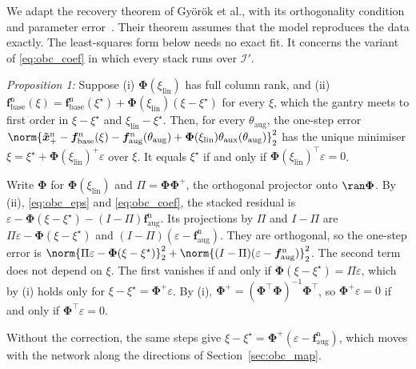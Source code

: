 We adapt the recovery theorem of Gy\"or\"ok et al., with its orthogonality
condition and parameter error~\cite[Cond.~4, Assumption~6, Thm.~7, Eq.~(21)]{gyorok2026obc}.
Their theorem assumes that the model reproduces the data exactly.
The least-squares form below needs no exact fit.
It concerns the variant of \eqref{eq:obc_coef} in which every stack runs over
$\mathcal I'$.

\textit{Proposition 1:} Suppose (i) $\boldsymbol\Phi(\xi_{\mathrm{lin}})$ has
full column rank, and (ii)
$\boldsymbol f^{\mathrm n}_{\mathrm{base}}(\xi)=\boldsymbol f^{\mathrm n}_{\mathrm{base}}(\xi^\star)+\boldsymbol\Phi(\xi_{\mathrm{lin}})(\xi-\xi^\star)$
for every $\xi$, which the gantry meets to first order in $\xi-\xi^\star$ and
$\xi_{\mathrm{lin}}-\xi^\star$.
Then, for every $\theta_{\mathrm{aug}}$, the one-step error
$\norm{\boldsymbol{\tilde x}^{\mathrm n}_{+}-\boldsymbol f^{\mathrm n}_{\mathrm{base}}(\xi)-\boldsymbol f^{\mathrm n}_{\mathrm{aug}}(\theta_{\mathrm{aug}})+\boldsymbol\Phi(\xi_{\mathrm{lin}})\theta_{\mathrm{aux}}(\theta_{\mathrm{aug}})}_2^2$
has the unique minimiser $\xi=\xi^\star+\boldsymbol\Phi(\xi_{\mathrm{lin}})^{+}\varepsilon$
over $\xi$.
It equals $\xi^\star$ if and only if
$\boldsymbol\Phi(\xi_{\mathrm{lin}})^\top\varepsilon=0$.

\begin{IEEEproof}
Write $\boldsymbol\Phi$ for $\boldsymbol\Phi(\xi_{\mathrm{lin}})$ and
$\Pi=\boldsymbol\Phi\boldsymbol\Phi^{+}$, the orthogonal projector onto
$\ran\boldsymbol\Phi$.
By (ii), \eqref{eq:obc_eps} and \eqref{eq:obc_coef}, the stacked residual is
$\varepsilon-\boldsymbol\Phi(\xi-\xi^\star)-(I-\Pi)\boldsymbol f^{\mathrm n}_{\mathrm{aug}}$.
Its projections by $\Pi$ and $I-\Pi$ are
$\Pi\varepsilon-\boldsymbol\Phi(\xi-\xi^\star)$ and
$(I-\Pi)(\varepsilon-\boldsymbol f^{\mathrm n}_{\mathrm{aug}})$.
They are orthogonal, so the one-step error is
$\norm{\Pi\varepsilon-\boldsymbol\Phi(\xi-\xi^\star)}_2^2+\norm{(I-\Pi)(\varepsilon-\boldsymbol f^{\mathrm n}_{\mathrm{aug}})}_2^2$.
The second term does not depend on $\xi$.
The first vanishes if and only if
$\boldsymbol\Phi(\xi-\xi^\star)=\Pi\varepsilon$, which by (i) holds only for
$\xi-\xi^\star=\boldsymbol\Phi^{+}\varepsilon$.
By (i), $\boldsymbol\Phi^{+}=(\boldsymbol\Phi^\top\boldsymbol\Phi)^{-1}\boldsymbol\Phi^\top$,
so $\boldsymbol\Phi^{+}\varepsilon=0$ if and only if
$\boldsymbol\Phi^\top\varepsilon=0$.
\end{IEEEproof}

Without the correction, the same steps give
$\xi-\xi^\star=\boldsymbol\Phi^{+}(\varepsilon-\boldsymbol f^{\mathrm n}_{\mathrm{aug}})$,
which moves with the network along the directions of
Section~\ref{sec:obc_map}.

